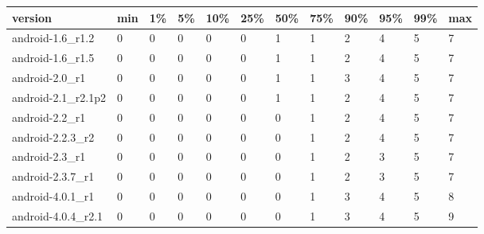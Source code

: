 \documentclass[a4paper]{article}
\begin{document}
\begin{tabular}{|l|l|l|l|l|l|l|l|l|l|l|l|}
\hline
version&min&1\%&5\%&10\%&25\%&50\%&75\%&90\%&95\%&99\%&max\\
\hline
android-1.6\_r1.2&0&0&0&0&0&1&1&2&4&5&7\\
\hline
android-1.6\_r1.5&0&0&0&0&0&1&1&2&4&5&7\\
\hline
android-2.0\_r1&0&0&0&0&0&1&1&3&4&5&7\\
\hline
android-2.1\_r2.1p2&0&0&0&0&0&1&1&2&4&5&7\\
\hline
android-2.2\_r1&0&0&0&0&0&0&1&2&4&5&7\\
\hline
android-2.2.3\_r2&0&0&0&0&0&0&1&2&4&5&7\\
\hline
android-2.3\_r1&0&0&0&0&0&0&1&2&3&5&7\\
\hline
android-2.3.7\_r1&0&0&0&0&0&0&1&2&3&5&7\\
\hline
android-4.0.1\_r1&0&0&0&0&0&0&1&3&4&5&8\\
\hline
android-4.0.4\_r2.1&0&0&0&0&0&0&1&3&4&5&9\\
\hline
\end{tabular}
\end{document}
